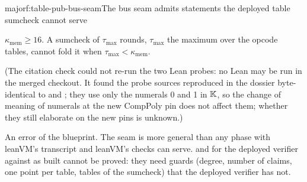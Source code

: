 \begin{finding}{major}{f:table-pub-bus-seam}{The bus seam admits statements the deployed table sumcheck cannot serve}
\begin{enumerate}[label=(\alph*)]
  $κ_{\mathrm{mem}} ≥ 16$. A sumcheck of $τ_{\max}$ rounds, $τ_{\max}$ the maximum over the opcode
  tables, cannot fold it when $τ_{\max} < κ_{\mathrm{mem}}$.
\end{enumerate}
(The citation check could not re-run the two Lean probes: no Lean may be run in the merged
checkout. It found the probe sources reproduced in the dossier byte-identical to
 and ; they use only the
numerals 0 and 1 in $\mathbb{K}$, so the change of meaning of numerals at the new CompPoly pin does not
affect them; whether they still elaborate on the new pins is unknown.)

 An error of the blueprint. The seam is more general than any phase with
leanVM's transcript and leanVM's checks can serve.  and
 for the deployed verifier against  as built cannot be proved:
they need guards (degree, number of claims, one point per table, tables of the sumcheck) that the
deployed verifier has not.


\end{finding}
